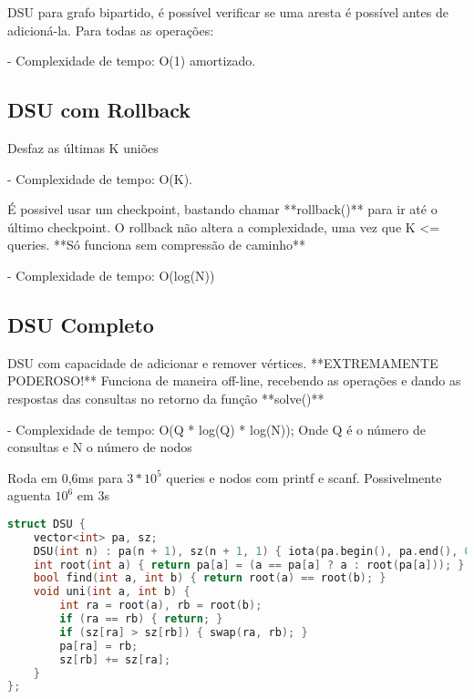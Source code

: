 \documentclass[11pt, a4paper, twoside]{article}
\begin{document}
DSU para grafo bipartido, é possível verificar se uma aresta é possível antes de adicioná-la.  
Para todas as operações:

- Complexidade de tempo: O(1) amortizado.

\subsection{DSU com Rollback}

Desfaz as últimas K uniões

- Complexidade de tempo: O(K).

É possivel usar um checkpoint, bastando chamar **rollback()** para ir até o último checkpoint.  
O rollback não altera a complexidade, uma vez que K <= queries.  
**Só funciona sem compressão de caminho**

- Complexidade de tempo: O(log(N))

\subsection{DSU Completo}

DSU com capacidade de adicionar e remover vértices.  
**EXTREMAMENTE PODEROSO!**  
Funciona de maneira off-line, recebendo as operações e dando as respostas das consultas no retorno da função **solve()**

- Complexidade de tempo: O(Q * log(Q) * log(N)); Onde Q é o número de consultas e N o número de nodos

Roda em 0,6ms para $3 * 10^5$ queries e nodos com printf e scanf.  
Possivelmente aguenta $10^6$ em 3s


\begin{lstlisting}[language=C++]
struct DSU {
    vector<int> pa, sz;
    DSU(int n) : pa(n + 1), sz(n + 1, 1) { iota(pa.begin(), pa.end(), 0); }
    int root(int a) { return pa[a] = (a == pa[a] ? a : root(pa[a])); }
    bool find(int a, int b) { return root(a) == root(b); }
    void uni(int a, int b) {
        int ra = root(a), rb = root(b);
        if (ra == rb) { return; }
        if (sz[ra] > sz[rb]) { swap(ra, rb); }
        pa[ra] = rb;
        sz[rb] += sz[ra];
    }
};
\end{lstlisting}
\end{document}
